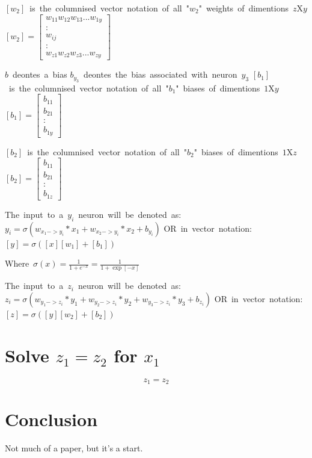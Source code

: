 \documentclass{article}
\begin{document}
\vspace{2mm}
\hbox{$[w_2]$ is the columnised vector notation of all "$w_2$" weights of dimentions $z$X$y$}
\hbox{$[w_2] = [
    \begin{matrix}
        w_{11} w_{12} w_{13} ... w_{1y} \\
        :\\
        w_{ij}\\
        :\\
        w_{z1} w_{z2} w_{z3} ... w_{zy}
    \end{matrix}
]$}


\vspace{4mm}
\hbox{$b$ deontes a bias}
\hbox{$b_{y_3}$ deontes the bias associated with neuron $y_3$}
\hbox{$[b_1]$ is the columnised vector notation of all "$b_1$" biases of dimentions $1$X$y$ }
\hbox{$[b_1] = [
    \begin{matrix}
        b_{11}\\
        b_{21}\\
        :\\
        b_{1y}
    \end{matrix}
]$}

\vspace{2mm}
\hbox{$[b_2]$ is the columnised vector notation of all "$b_2$" biases of dimentions $1$X$z$ }
\hbox{$[b_2] = [
    \begin{matrix}
        b_{11}\\
        b_{21}\\
        :\\
        b_{1z}
    \end{matrix}
]$}

\vspace{5mm}
\hbox{The input to a $y_i$ neuron will be denoted as:}
\hbox{$y_i = \sigma(w_{x_1->y_i} * x_1 + w_{x_2->y_i} * x_2 + b_{y_i} )$}
\hbox{OR in vector notation:}
\hbox{$[y] = \sigma([x][w_1] + [b_1])$}

\vspace{2mm}
\hbox{Where $\sigma(x) = \frac{1}{1+e^{-x}} = \frac{1}{1+\exp[-x]}$}

\vspace{5mm}
\hbox{The input to a $z_i$ neuron will be denoted as:}
\hbox{$z_i = \sigma(w_{y_1->z_i}*y_1 + w_{y_2->z_i}*y_2 + w_{y_3->z_i}*y_3 + b_{z_i} )$}
\hbox{OR in vector notation:}
\hbox{$[z] = \sigma([y][w_2] + [b_2])$}





\section{Solve $z_1 = z_2$ for $x_1$}
\begin{equation}
    z_1 = z_2    
\end{equation}




\section{Conclusion}
Not much of a paper, but it's a start.
\end{document}
